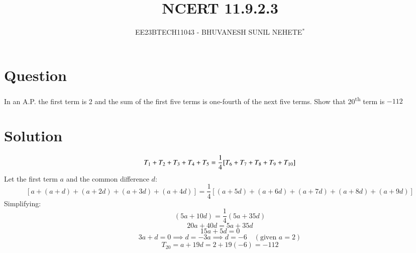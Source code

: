 \documentclass[journal,12pt,twocolumn]{IEEEtran}
\theoremstyle{remark}
\begin{document}

\vspace{3cm}

\title{NCERT 11.9.2.3}
\author{EE23BTECH11043 - BHUVANESH SUNIL NEHETE$^{*}$%
}
\maketitle
\newpage
\bigskip

\renewcommand{\thefigure}{\theenumi}
\renewcommand{\thetable}{\theenumi}



\section*{Question}

In an A.P. the first term is 2 and the sum of the first five terms is one-fourth of the next five terms. Show that 20\textsuperscript{th} term is $-112$

\section*{Solution}

\[T_1 + T_2 + T_3 + T_4 + T_5 = \\\frac{1}{4} [T_6 + T_7 + T_8 + T_9 + T_{10}]\]
Let the first term \(a\) and the common difference \(d\):
\[[a + (a + d) + (a + 2d) + (a + 3d) + (a + 4d)] = \frac{1}{4} [(a + 5d) + (a + 6d) + (a + 7d) + (a + 8d) + (a + 9d)]\]
Simplifying:
\[(5a + 10d) = \frac{1}{4}(5a + 35d)\]
\[20a + 40d = 5a + 35d\]
\[15a + 5d = 0\]
\[3a + d = 0 \implies d = -3a \implies d = -6 \quad (\text{given } a = 2)\]
\[T_{20} = a + 19d = 2 + 19(-6) = -112\]
\end{document}
